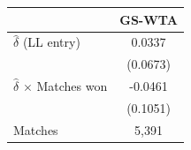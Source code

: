 \begin{tabular}{lc}
\toprule
 & GS-WTA \\
\midrule
$\hat{\delta}$ (LL entry) & 0.0337 \\
 & (0.0673) \\
$\hat{\delta}$ $\times$ Matches won & -0.0461 \\
 & (0.1051) \\
\midrule
Matches & 5,391 \\
\bottomrule
\end{tabular}
